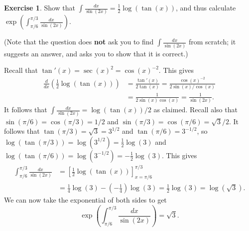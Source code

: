 \documentclass[a4paper]{amsart}
\theoremstyle{definition}
\newtheorem{exercise}{Exercise}[section]
\newenvironment{solution}{{\noindent \bf Solution:}}{}
\begin{document}
\begin{exercise}\label{ex-int-csc}
Show that
 $\displaystyle \int \frac{dx}{\sin(2x)} = \tfrac{1}{2}\log(\tan(x))$,
 and thus calculate 
 $\displaystyle \exp\left(\int_{\pi/6}^{\pi/3} \frac{dx}{\sin(2x)}\right)$.

 (Note that the question does \textbf{not} ask you to find
 $\int \frac{dx}{\sin(2x)}$ from scratch; it suggests an
 answer, and asks you to show that it is correct.)
\end{exercise}
\begin{solution}
 Recall that $\tan'(x)=\sec(x)^2=\cos(x)^{-2}$.  This gives 
 \begin{align*}
  \frac{d}{dx}\left(\tfrac{1}{2}\log(\tan(x))\right) &=
   \frac{\tan'(x)}{2\tan(x)} = \frac{\cos(x)^{-2}}{2\sin(x)/\cos(x)} \\
   &= \frac{1}{2\sin(x)\cos(x)} = \frac{1}{\sin(2x)}.
 \end{align*}
 It follows that $\int\frac{dx}{\sin(2x)}=\log(\tan(x))/2$ as
 claimed.  Recall also that $\sin(\pi/6)=\cos(\pi/3)=1/2$ and
 $\sin(\pi/3)=\cos(\pi/6)=\sqrt{3}/2$.  It follows that
 $\tan(\pi/3)=\sqrt{3}=3^{1/2}$ and $\tan(\pi/6)=3^{-1/2}$, so
 $\log(\tan(\pi/3))=\log(3^{1/2})=\tfrac{1}{2}\log(3)$ and  
 $\log(\tan(\pi/6))=\log(3^{-1/2})=-\tfrac{1}{2}\log(3)$.  This gives 
 \begin{align*}
  \int_{\pi/6}^{\pi/3} \frac{dx}{\sin(2x)} &= 
   \left[\tfrac{1}{2}\log(\tan(x))\right]_{x=\pi/6}^{\pi/3} \\
  &= \tfrac{1}{4}\log(3) - (-\tfrac{1}{4})\log(3) 
   = \tfrac{1}{2}\log(3) = \log(\sqrt{3}). 
 \end{align*}
 We can now take the exponential of both sides to get
 \[ \exp\left(\int_{\pi/6}^{\pi/3} \frac{dx}{\sin(2x)}\right) =
     \sqrt{3}.
 \]
\end{solution}
\end{document}
